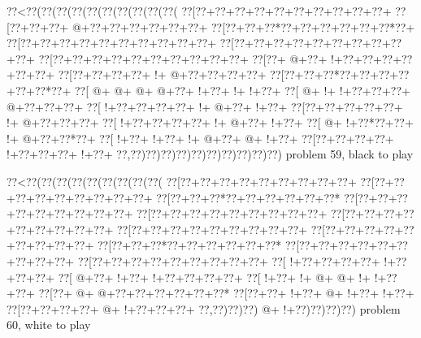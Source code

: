 \vbox{\vbox{\goo
\0??<\0??(\0??(\0??(\0??(\0??(\0??(\0??(\0??(\0??(\0??(
\0??[\0??+\0??+\0??+\0??+\0??+\0??+\0??+\0??+\0??+\0??+
\0??[\0??+\0??+\0??+\- @+\0??+\0??+\0??+\0??+\0??+\0??+
\0??[\0??+\0??+\0??*\0??+\0??+\0??+\0??+\0??+\0??*\0??+
\0??[\0??+\0??+\0??+\0??+\0??+\0??+\0??+\0??+\0??+\0??+
\0??[\0??+\0??+\0??+\0??+\0??+\0??+\0??+\0??+\0??+\0??+
\0??[\0??+\0??+\0??+\0??+\0??+\0??+\0??+\0??+\0??+\0??+
\0??[\0??+\- @+\0??+\- !+\0??+\0??+\0??+\0??+\0??+\0??+
\0??[\0??+\0??+\0??+\0??+\- !+\- @+\0??+\0??+\0??+\0??+
\0??[\0??+\0??+\0??*\0??+\0??+\0??+\0??+\0??+\0??*\0??+
\0??[\- @+\- @+\- @+\- @+\0??+\- !+\0??+\- !+\- !+\0??+
\0??[\- @+\- !+\- !+\0??+\0??+\0??+\- @+\0??+\0??+\0??+
\0??[\- !+\0??+\0??+\0??+\0??+\- !+\- @+\0??+\- !+\0??+
\0??[\0??+\0??+\0??+\0??+\0??+\- !+\- @+\0??+\0??+\0??+
\0??[\- !+\0??+\0??+\0??+\0??+\- !+\- @+\0??+\- !+\0??+
\0??[\- @+\- !+\0??*\0??+\0??+\- !+\- @+\0??+\0??*\0??+
\0??[\- !+\0??+\- !+\0??+\- !+\- @+\0??+\- @+\- !+\0??+
\0??[\0??+\0??+\0??+\0??+\- !+\0??+\0??+\0??+\- !+\0??+
\0??,\0??)\0??)\0??)\0??)\0??)\0??)\0??)\0??)\0??)\0??)
}
\hfil problem 59, black to play\hfil\break
}

\vbox{\vbox{\goo
\0??<\0??(\0??(\0??(\0??(\0??(\0??(\0??(\0??(\0??(
\0??[\0??+\0??+\0??+\0??+\0??+\0??+\0??+\0??+\0??+
\0??[\0??+\0??+\0??+\0??+\0??+\0??+\0??+\0??+\0??+
\0??[\0??+\0??+\0??*\0??+\0??+\0??+\0??+\0??+\0??*
\0??[\0??+\0??+\0??+\0??+\0??+\0??+\0??+\0??+\0??+
\0??[\0??+\0??+\0??+\0??+\0??+\0??+\0??+\0??+\0??+
\0??[\0??+\0??+\0??+\0??+\0??+\0??+\0??+\0??+\0??+
\0??[\0??+\0??+\0??+\0??+\0??+\0??+\0??+\0??+\0??+
\0??[\0??+\0??+\0??+\0??+\0??+\0??+\0??+\0??+\0??+
\0??[\0??+\0??+\0??*\0??+\0??+\0??+\0??+\0??+\0??*
\0??[\0??+\0??+\0??+\0??+\0??+\0??+\0??+\0??+\0??+
\0??[\0??+\0??+\0??+\0??+\0??+\0??+\0??+\0??+\0??+
\0??[\- !+\0??+\0??+\0??+\0??+\- !+\0??+\0??+\0??+
\0??[\- @+\0??+\- !+\0??+\- !+\0??+\0??+\0??+\0??+
\0??[\- !+\0??+\- !+\- @+\- @+\- !+\- !+\0??+\0??+
\0??[\0??+\- @+\- @+\0??+\0??+\0??+\0??+\0??+\0??*
\0??[\0??+\0??+\- !+\0??+\- @+\- !+\0??+\- !+\0??+
\0??[\0??+\0??+\0??+\0??+\- @+\- !+\0??+\0??+\0??+
\0??,\0??)\0??)\0??)\- @+\- !+\0??)\0??)\0??)\0??)
}
\hfil problem 60, white to play\hfil\break
}

